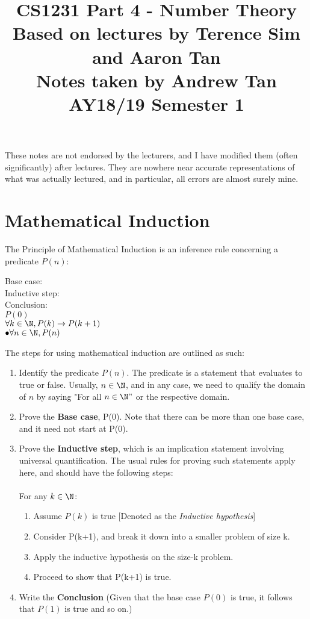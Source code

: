 \documentclass[a4paper]{article}
\title{%
	CS1231 Part 4 - Number Theory  \\
	\large Based on lectures by Terence Sim and Aaron Tan
	\\ Notes taken by Andrew Tan
	\\ AY18/19 Semester 1
	\\ }
\author{}
\date{\vspace{-5ex}}
\begin{document}
\maketitle

\begin{center}\begin{minipage}[c]{0.9\textwidth}\centering\footnotesize These notes are not endorsed by the lecturers, and I have modified them (often significantly) after lectures. They are nowhere near accurate representations of what was actually lectured, and in particular, all errors are almost surely mine.\end{minipage}\end{center}

\section{Mathematical Induction}
The Principle of Mathematical Induction is an inference rule concerning a predicate $P(n)$:
\begin{multicols}{3}
\flushleft Base case:  \\
Inductive step: \\
Conclusion:\\
\columnbreak
$P(0)$\\
$\forall k \in \N, P(k) \rightarrow P(k+1)$\\
$\bullet \forall n \in \N, P(n)$
\columnbreak
\end{multicols}
The steps for using mathematical induction are outlined as such:
\begin{enumerate}
	\item Identify the predicate $P(n)$. The predicate is a statement that evaluates to true or false. Usually, $n\in\N$, and in any case, we need to qualify the domain of $n$ by saying "For all $n\in\N"$ or the respective domain.
	\item Prove the \textbf{Base case}, P(0). Note that there can be more than one base case, and it need not start at P(0).
	\item Prove the \textbf{Inductive step}, which is an implication statement involving universal quantification. The usual rules for proving such statements apply here, and should have the following steps:\\ \\
	For any $k\in\N$:
	\begin{enumerate}
		\item[3.1] Assume $P(k)$ is true [Denoted as the \textit{Inductive hypothesis}]
		\item[3.2] Consider P(k+1), and break it down into a smaller problem of size k.
		\item[3.3] Apply the inductive hypothesis on the size-k problem.
		\item[3.4] Proceed to show that P(k+1) is true.
	\end{enumerate}
	\item Write the \textbf{Conclusion} (Given that the base case $P(0)$ is true, it follows that $P(1)$ is true and so on.)
\end{enumerate}
\end{document}
